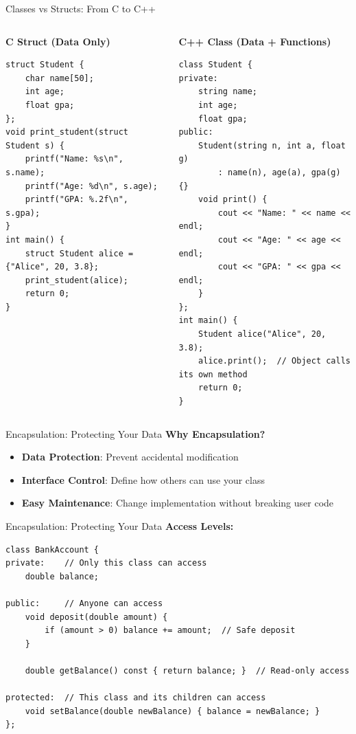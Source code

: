 \begin{frame}[fragile]{ Classes vs Structs: From C to C++}
	\begin{columns}
		\begin{column}{0.5\textwidth}
			\textbf{C Struct (Data Only)}
			\begin{verbatim}
struct Student {
    char name[50];
    int age;
    float gpa;
};
void print_student(struct Student s) {
    printf("Name: %s\n", s.name);
    printf("Age: %d\n", s.age);
    printf("GPA: %.2f\n", s.gpa);
}
int main() {
    struct Student alice = {"Alice", 20, 3.8};
    print_student(alice);
    return 0;
}
			\end{verbatim}
		\end{column}
		\begin{column}{0.5\textwidth}
			\textbf{C++ Class (Data + Functions)}
			\begin{verbatim}
class Student {
private:
    string name;
    int age;
    float gpa;
public:
    Student(string n, int a, float g)
        : name(n), age(a), gpa(g) {}
    void print() {
        cout << "Name: " << name << endl;
        cout << "Age: " << age << endl;
        cout << "GPA: " << gpa << endl;
    }
};
int main() {
    Student alice("Alice", 20, 3.8);
    alice.print();  // Object calls its own method
    return 0;
}
			\end{verbatim}
		\end{column}
	\end{columns}
\end{frame}

\begin{frame}[fragile]{ Encapsulation: Protecting Your Data}
    \textbf{Why Encapsulation?}
    \begin{itemize}
        \item \textbf{Data Protection}: Prevent accidental modification
        \item \textbf{Interface Control}: Define how others can use your class
        \item \textbf{Easy Maintenance}: Change implementation without breaking user code
    \end{itemize}
\end{frame}

\begin{frame}[fragile]{ Encapsulation: Protecting Your Data}
    \textbf{Access Levels:}
    \begin{verbatim}
class BankAccount {
private:    // Only this class can access
    double balance;

public:     // Anyone can access
    void deposit(double amount) {
        if (amount > 0) balance += amount;  // Safe deposit
    }

    double getBalance() const { return balance; }  // Read-only access

protected:  // This class and its children can access
    void setBalance(double newBalance) { balance = newBalance; }
};
    \end{verbatim}
\end{frame}

